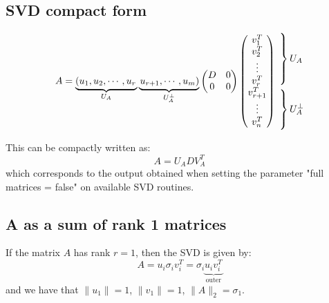 \documentclass[a4paper, 12pt]{article}
\begin{document}
\subsection{SVD compact form}
$$
A = \underbrace{\left(u_1, u_2, \cdots, u_r\right.}_{U_A} \underbrace{\left.u_{r+1}, \cdots, u_m\right)}_{U_A^\perp}
\begin{pmatrix}
D & 0 \\
0 & 0
\end{pmatrix}
    \begin{pmatrix}
        v_1^T \\
        v_2^T \\
        \vdots \\
        v_r^T \\
        v_{r+1}^T \\
        \vdots \\
        v_n^T
        \end{pmatrix}
    \begin{aligned}
        &\left.
            \vphantom{\begin{matrix}
                u_1 \\
                u_2 \\
                \vdots \\
                u_r 
                \end{matrix}}
        \right\}U_A \\
        &\left.
            \vphantom{\begin{matrix}
                u_1 \\
                \vdots \\
                u_r 
                \end{matrix}}
        \right\}U_A^\perp
    \end{aligned}
$$
    
This can be compactly written as:
\[
A = U_A D V_A^T
\]
which corresponds to the output obtained when setting the parameter "full matrices = false" on available SVD routines.

\subsection{A as a sum of rank 1 matrices}
If the matrix \( A \) has rank \( r = 1 \), then the SVD is given by:
\[
A = u_i \sigma_i v_i^T = \sigma_i \underbrace{u_i v_i^T}_{\text{outer}}
\]
and we have that $\| u_1 \| = 1$, $ \| v_1 \| = 1$, $\| A \|_2 = \sigma_1$.
\end{document}
